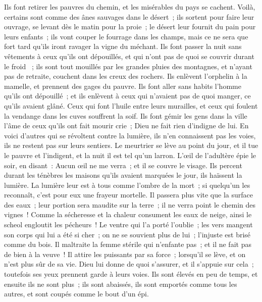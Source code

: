 \begin{multicols}{2}
Ils font retirer les pauvres du chemin, et les misérables du pays se cachent.
Voilà, certains sont comme des ânes sauvages dans le désert~; ils sortent pour faire leur ouvrage, se levant dès le matin pour la proie~; le désert leur fournit du pain pour leurs enfants~;
ils vont couper le fourrage dans les champs, mais ce ne sera que fort tard qu'ils iront ravager la vigne du méchant. 
Ils font passer la nuit sans vêtements à ceux qu'ils ont dépouillés, et qui n'ont pas de quoi se couvrir durant le froid ~;
ils sont tout mouillés par les grandes pluies des montagnes, et n'ayant pas de retraite, couchent dans les creux des rochers. 
Ils enlèvent l'orphelin à la mamelle, et prennent des gages du pauvre. 
Ils font aller sans habits l'homme qu'ils ont dépouillé~; et ils enlèvent à ceux qui n'avaient pas de quoi manger, ce qu'ils avaient glâné.
Ceux qui font l'huile entre leurs murailles, et ceux qui foulent la vendange dans les cuves souffrent la soif.
Ils font gémir les gens dans la ville l'âme de ceux qu'ils ont fait mourir crie~; Dieu ne fait rien d'indigne de lui.
En voici d'autres qui se révoltent contre la lumière, ils n'en connaissent pas les voies, ils ne restent pas sur leurs sentiers.
Le meurtrier se lève au point du jour, et il tue le pauvre et l'indigent, et la nuit il est tel qu'un larron.
L'œil de l'adultère épie le soir, en disant~: Aucun œil ne me verra~; et il se couvre le visage.
Ils percent durant les ténèbres les maisons qu'ils avaient marquées le jour, ils haïssent la lumière.
La lumière leur est à tous comme l'ombre de la mort~; si quelqu'un les reconnaît, c'est pour eux une frayeur mortelle.
Il passera plus vite que la surface des eaux~; leur portion sera maudite sur la terre~; il ne verra point le chemin des vignes~!
Comme la sécheresse et la chaleur consument les eaux de neige, ainsi le scheol engloutit les pécheurs~!
Le ventre qui l'a porté l'oublie~; les vers mangent son corps qui lui a été si cher~; on ne se souvient plus de lui~; l'injuste est brisé comme du bois.
Il maltraite la femme stérile qui n'enfante pas~; et il ne fait pas de bien à la veuve~!
Il attire les puissants par sa force~; lorsqu'il se lève, et on n'est plus sûr de sa vie. 
Dieu lui donne de quoi s'assurer, et il s'appuie sur cela~; toutefois ses yeux prennent garde à leurs voies.
Ils sont élevés en peu de temps, et ensuite ils ne sont plus~; ils sont abaissés, ils sont emportés comme tous les autres, et sont coupés comme le bout d'un épi. 

\end{multicols}
